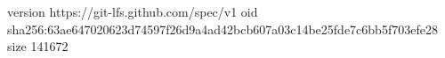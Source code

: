 version https://git-lfs.github.com/spec/v1
oid sha256:63ae647020623d74597f26d9a4ad42bcb607a03c14be25fde7c6bb5f703efe28
size 141672
